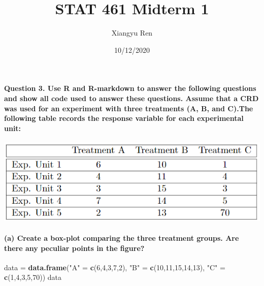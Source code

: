 \documentclass[
]{article}
\title{STAT 461 Midterm 1}
\author{Xiangyu Ren}
\date{10/12/2020}
\newenvironment{Shaded}{\begin{snugshade}}{\end{snugshade}}
\newcommand{\DecValTok}[1]{\textcolor[rgb]{0.00,0.00,0.81}{#1}}
\newcommand{\KeywordTok}[1]{\textcolor[rgb]{0.13,0.29,0.53}{\textbf{#1}}}
\newcommand{\NormalTok}[1]{#1}
\newcommand{\StringTok}[1]{\textcolor[rgb]{0.31,0.60,0.02}{#1}}
\begin{document}
\maketitle

\hypertarget{question-3.-use-r-and-r-markdown-to-answer-the-following-questions-and-show-all-code-used-to-answer-these-questions.-assume-that-a-crd-was-used-for-an-experiment-with-three-treatments-a-b-and-c.the-following-table-records-the-response-variable-for-each-experimental-unit}{%
\paragraph{Question 3. Use R and R-markdown to answer the following
questions and show all code used to answer these questions. Assume that
a CRD was used for an experiment with three treatments (A, B, and C).The
following table records the response variable for each experimental
unit:}\label{question-3.-use-r-and-r-markdown-to-answer-the-following-questions-and-show-all-code-used-to-answer-these-questions.-assume-that-a-crd-was-used-for-an-experiment-with-three-treatments-a-b-and-c.the-following-table-records-the-response-variable-for-each-experimental-unit}}

\includegraphics{table_1.png}

\hypertarget{a-create-a-box-plot-comparing-the-three-treatment-groups.-are-there-any-peculiar-points-in-the-figure}{%
\paragraph{(a) Create a box-plot comparing the three treatment groups.
Are there any peculiar points in the
figure?}\label{a-create-a-box-plot-comparing-the-three-treatment-groups.-are-there-any-peculiar-points-in-the-figure}}

\begin{Shaded}
\begin{Highlighting}[]
\NormalTok{data =}\StringTok{ }\KeywordTok{data.frame}\NormalTok{(}\StringTok{"A"}\NormalTok{ =}\StringTok{ }\KeywordTok{c}\NormalTok{(}\DecValTok{6}\NormalTok{,}\DecValTok{4}\NormalTok{,}\DecValTok{3}\NormalTok{,}\DecValTok{7}\NormalTok{,}\DecValTok{2}\NormalTok{), }\StringTok{"B"}\NormalTok{ =}\StringTok{ }\KeywordTok{c}\NormalTok{(}\DecValTok{10}\NormalTok{,}\DecValTok{11}\NormalTok{,}\DecValTok{15}\NormalTok{,}\DecValTok{14}\NormalTok{,}\DecValTok{13}\NormalTok{), }\StringTok{"C"}\NormalTok{ =}\StringTok{ }\KeywordTok{c}\NormalTok{(}\DecValTok{1}\NormalTok{,}\DecValTok{4}\NormalTok{,}\DecValTok{3}\NormalTok{,}\DecValTok{5}\NormalTok{,}\DecValTok{70}\NormalTok{))}
\NormalTok{data}
\end{Highlighting}
\end{Shaded}
\end{document}
